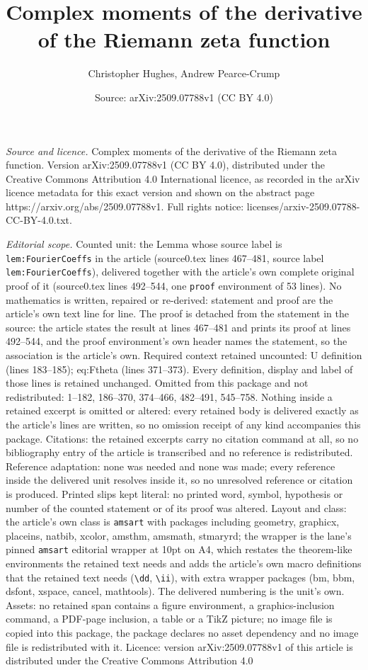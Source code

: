\documentclass[10pt,a4paper]{amsart}
\title[Complex moments of the derivative of the Riemann zeta functi]{Complex moments of the derivative of the Riemann zeta function}
\author{Christopher Hughes, Andrew Pearce-Crump}
\date{Source: arXiv:2509.07788v1 (CC BY 4.0)}
\begin{document}
\maketitle

\noindent\emph{Source and licence.} Complex moments of the derivative of the Riemann zeta function. Version arXiv:2509.07788v1 (CC BY 4.0), distributed under the Creative Commons Attribution 4.0 International licence, as recorded in the arXiv licence metadata for this exact version and shown on the abstract page https://arxiv.org/abs/2509.07788v1. Full rights notice: licenses/arxiv-2509.07788-CC-BY-4.0.txt.\par\smallskip

\noindent\textit{Editorial scope.} Counted unit: the Lemma whose source label is \texttt{lem:FourierCoeffs} in the article (source0.tex lines 467--481, source label \texttt{lem:FourierCoeffs}), delivered together with the article's own complete original proof of it (source0.tex lines 492--544, one \texttt{proof} environment of 53 lines). No mathematics is written, repaired or re-derived: statement and proof are the article's own text line for line. The proof is detached from the statement in the source: the article states the result at lines 467--481 and prints its proof at lines 492--544, and the proof environment's own header names the statement, so the association is the article's own. Required context retained uncounted: U definition (lines 183--185); eq:Ftheta (lines 371--373). Every definition, display and label of those lines is retained unchanged. Omitted from this package and not redistributed: 1--182, 186--370, 374--466, 482--491, 545--758. Nothing inside a retained excerpt is omitted or altered: every retained body is delivered exactly as the article's lines are written, so no omission receipt of any kind accompanies this package. Citations: the retained excerpts carry no citation command at all, so no bibliography entry of the article is transcribed and no reference is redistributed. Reference adaptation: none was needed and none was made; every reference inside the delivered unit resolves inside it, so no unresolved reference or citation is produced. Printed slips kept literal: no printed word, symbol, hypothesis or number of the counted statement or of its proof was altered. Layout and class: the article's own class is \texttt{amsart} with packages including geometry, graphicx, placeins, natbib, xcolor, amsthm, amsmath, stmaryrd; the wrapper is the lane's pinned \texttt{amsart} editorial wrapper at 10pt on A4, which restates the theorem-like environments the retained text needs and adds the article's own macro definitions that the retained text needs (\texttt{\textbackslash dd}, \texttt{\textbackslash ii}), with extra wrapper packages (bm, bbm, dsfont, xspace, cancel, mathtools). The delivered numbering is the unit's own. Assets: no retained span contains a figure environment, a graphics-inclusion command, a PDF-page inclusion, a table or a TikZ picture; no image file is copied into this package, the package declares no asset dependency and no image file is redistributed with it. Licence: version arXiv:2509.07788v1 of this article is distributed under the Creative Commons Attribution 4.0 
\end{document}
